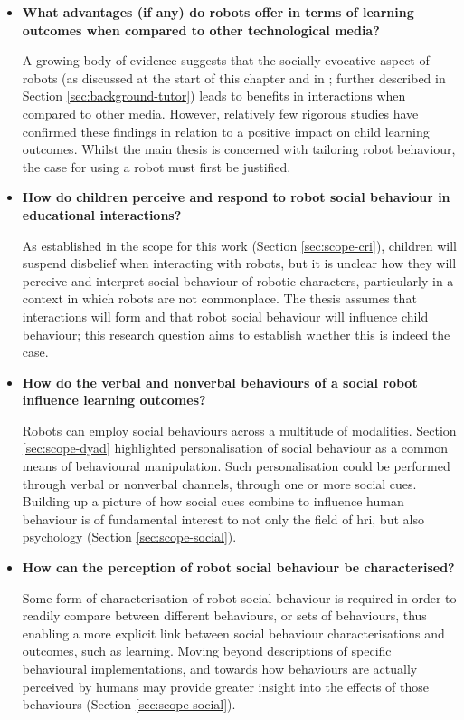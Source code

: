 \begin{itemize}

\item \textbf{What advantages (if any) do robots offer in terms of \gls{learning} outcomes when compared to other technological media?}

A growing body of evidence suggests that the socially evocative aspect of robots (as discussed at the start of this chapter and in \citealp{fong2003survey}; further described in Section \ref{sec:background-tutor}) leads to benefits in interactions when compared to other media. However, relatively few rigorous studies have confirmed these findings in relation to a positive impact on child \gls{learning} outcomes. Whilst the main thesis is concerned with tailoring robot behaviour, the case for using a robot must first be justified.

\item \textbf{How do children perceive and respond to robot social behaviour in educational interactions?}
		
As established in the scope for this work (Section \ref{sec:scope-cri}), children will suspend disbelief when interacting with robots, but it is unclear how they will perceive and interpret social behaviour of robotic characters, particularly in a context in which robots are not commonplace. The thesis assumes that interactions will form and that robot social behaviour will influence child behaviour; this research question aims to establish whether this is indeed the case.

\item \textbf{How do the verbal and nonverbal behaviours of a social robot influence \gls{learning} outcomes?}

Robots can employ social behaviours across a multitude of modalities. Section \ref{sec:scope-dyad} highlighted personalisation of social behaviour as a common means of behavioural manipulation. Such personalisation could be performed through verbal or nonverbal channels, through one or more social cues. Building up a picture of how social cues combine to influence human behaviour is of fundamental interest to not only the field of \acrshort{hri}, but also psychology (Section \ref{sec:scope-social}).

\item \textbf{How can the perception of robot social behaviour be characterised?}

Some form of characterisation of robot social behaviour is required in order to readily compare between different behaviours, or sets of behaviours, thus enabling a more explicit link between social behaviour characterisations and outcomes, such as \gls{learning}. Moving beyond descriptions of specific behavioural implementations, and towards how behaviours are actually perceived by humans may provide greater insight into the effects of those behaviours (Section \ref{sec:scope-social}).
\end{itemize}

